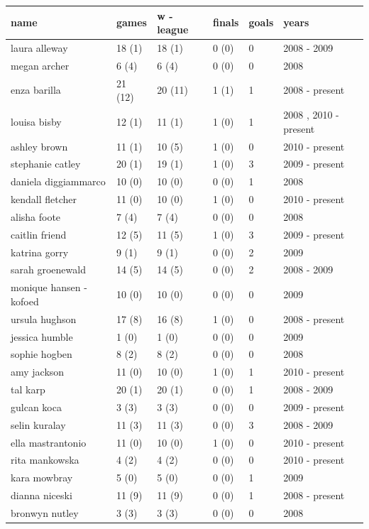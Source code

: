 \documentclass{article}
\begin{document}
\begin{tabular}{llllll}
\toprule
name & games & w - league & finals & goals & years \\
\midrule
laura alleway & 18 (1) & 18 (1) & 0 (0) & 0 & 2008 - 2009 \\
megan archer & 6 (4) & 6 (4) & 0 (0) & 0 & 2008 \\
enza barilla & 21 (12) & 20 (11) & 1 (1) & 1 & 2008 - present \\
louisa bisby & 12 (1) & 11 (1) & 1 (0) & 1 & 2008 , 2010 - present \\
ashley brown & 11 (1) & 10 (5) & 1 (0) & 0 & 2010 - present \\
stephanie catley & 20 (1) & 19 (1) & 1 (0) & 3 & 2009 - present \\
daniela diggiammarco & 10 (0) & 10 (0) & 0 (0) & 1 & 2008 \\
kendall fletcher & 11 (0) & 10 (0) & 1 (0) & 0 & 2010 - present \\
alisha foote & 7 (4) & 7 (4) & 0 (0) & 0 & 2008 \\
caitlin friend & 12 (5) & 11 (5) & 1 (0) & 3 & 2009 - present \\
katrina gorry & 9 (1) & 9 (1) & 0 (0) & 2 & 2009 \\
sarah groenewald & 14 (5) & 14 (5) & 0 (0) & 2 & 2008 - 2009 \\
monique hansen - kofoed & 10 (0) & 10 (0) & 0 (0) & 0 & 2009 \\
ursula hughson & 17 (8) & 16 (8) & 1 (0) & 0 & 2008 - present \\
jessica humble & 1 (0) & 1 (0) & 0 (0) & 0 & 2009 \\
sophie hogben & 8 (2) & 8 (2) & 0 (0) & 0 & 2008 \\
amy jackson & 11 (0) & 10 (0) & 1 (0) & 1 & 2010 - present \\
tal karp & 20 (1) & 20 (1) & 0 (0) & 1 & 2008 - 2009 \\
gulcan koca & 3 (3) & 3 (3) & 0 (0) & 0 & 2009 - present \\
selin kuralay & 11 (3) & 11 (3) & 0 (0) & 3 & 2008 - 2009 \\
ella mastrantonio & 11 (0) & 10 (0) & 1 (0) & 0 & 2010 - present \\
rita mankowska & 4 (2) & 4 (2) & 0 (0) & 0 & 2010 - present \\
kara mowbray & 5 (0) & 5 (0) & 0 (0) & 1 & 2009 \\
dianna niceski & 11 (9) & 11 (9) & 0 (0) & 1 & 2008 - present \\
bronwyn nutley & 3 (3) & 3 (3) & 0 (0) & 0 & 2008 \\

\end{tabular}
\end{document}
